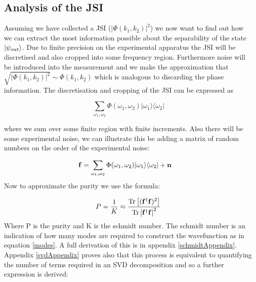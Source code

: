 
\subsection{Analysis of the JSI}

Assuming we have collected a JSI ($|\Phi(k_1,k_2)|^2$) we now want to find out how we can extract the most information possible about the separability of the state $\ket{\psi_{out}}$. Due to finite precision on the experimental apparatus the JSI will be discretised and also cropped into some frequency region. Furthermore noise will be introduced into the measurement and we make the approximation that $\sqrt{|\Phi(k_1,k_2)|^2}\sim \Phi(k_1,k_2)$ which is analogous to discarding the phase information. The discretisation and cropping of the JSI can be expressed as

\begin{equation}
\sum_{\omega_1,\omega_2}\Phi(\omega_1,\omega_2)|\omega_1\rangle\langle\omega_2|
\end{equation}

where we sum over some finite region with finite increments. Also there will be some experimental noise, we can illustrate this be adding a matrix of random numbers on the order of the experimental noise:

\begin{align}
{\bf f}&=\sum_{\omega_1,\omega_2}\Phi(\omega_1,\omega_2)|\omega_1\rangle\langle\omega_2| + {\bf n }
\end{align}
\noindent
Now to approximate the purity we use the formula:

\begin{equation} \label{purityEqn}
P = \frac{1}{K}\approx\frac{\operatorname{Tr}\left [({\bf f}^{\dagger}{\bf f})^2 \right ]}{\operatorname{Tr}\left [{\bf f}^{\dagger}{\bf f} \right ]^2}
\end{equation}
\noindent
Where P is the purity and K is the schmidt number. The schmidt number is an indication of how many modes are required to construct the wavefunction as in equation \ref{modes}. A full derivation of this is in appendix \ref{schmidtAppendix}. Appendix \ref{svdAppendix} proves also that this process is equivalent to quantifying the number of terms required in an SVD decomposition and so a further expression is derived:

